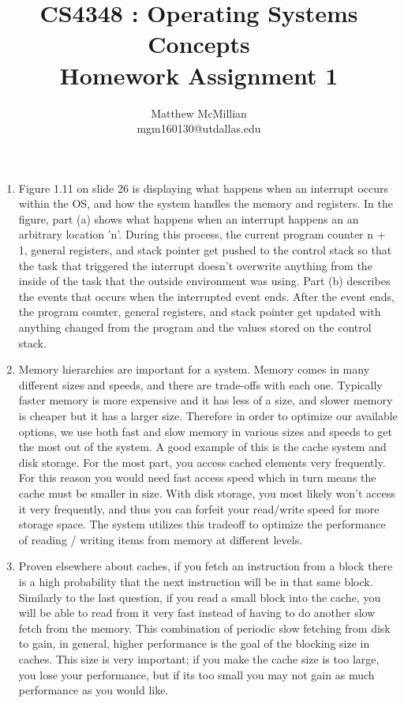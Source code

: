 \documentclass[12pt]{article}
\begin{document}
\title{CS4348 : Operating Systems Concepts\\Homework Assignment 1}
\author{Matthew McMillian\\mgm160130@utdallas.edu}
\maketitle

\begin{enumerate}
	
	\item Figure 1.11 on slide 26 is displaying what happens when an interrupt occurs 			within the OS, and how the system handles the memory and registers. In the figure, 			part (a) shows what happens when an interrupt happens an an arbitrary location 'n'. 		During this process, the current program counter n + 1, general registers, and stack 		pointer get pushed to the control stack so that the task that triggered the interrupt 		doesn't overwrite anything from the inside of the task that the outside environment 		was using. Part (b) describes the events that occurs when the interrupted event ends. 		After the event ends, the program counter, general registers, and stack pointer get 		updated with anything changed from the program and the values stored on the control 		stack.

	\item Memory hierarchies are important for a system. Memory comes in many different 		sizes and speeds, and there are trade-offs with each one. Typically faster memory is 		more expensive and it has less of a size, and slower memory is cheaper but it has a 		larger size. Therefore in order to optimize our available options, we use both fast 		and slow memory in various sizes and speeds to get the most out of the system. A good 		example of this is the cache system and disk storage. For the most part, you access 		cached elements very frequently. For this reason you would need fast access speed 			which in turn means the cache must be smaller in size. With disk storage, you most 			likely won't access it very frequently, and thus you can forfeit your read/write speed 	for more storage space. The system utilizes this tradeoff to optimize the performance 		of reading / writing items from memory at different levels.

	\item Proven elsewhere about caches, if you fetch an instruction from a block there is 	a high probability that the next instruction will be in that same block. Similarly to 		the last question, if you read a small block into the cache, you will be able to read 		from it very fast instead of having to do another slow fetch from the memory. This 			combination of periodic slow fetching from disk to gain, in general, higher 				performance is the goal of the blocking size in caches. This size is very important; 		if you make the cache size is too large, you lose your performance, but if its too 			small you may not gain as much performance as you would like.


\end{enumerate}
\end{document}
